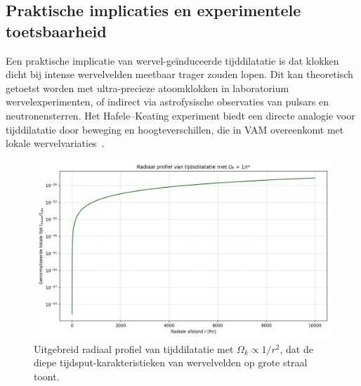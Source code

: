 \subsection{Praktische implicaties en experimentele toetsbaarheid}

Een praktische implicatie van wervel-geïnduceerde tijddilatatie is dat klokken dicht bij intense wervelvelden meetbaar trager zouden lopen. Dit kan theoretisch getoetst worden met ultra-precieze atoomklokken in laboratorium wervelexperimenten, of indirect via astrofysische observaties van pulsars en neutronensterren. Het Hafele–Keating experiment biedt een directe analogie voor tijddilatatie door beweging en hoogteverschillen, die in VAM overeenkomt met lokale wervelvariaties~\cite{hafele1972around}.

\begin{figure}[ht!]
    \centering
    \includegraphics[width=0.7\linewidth]{05-LogarithmicDecayLocalTime_nl}
    \caption{Uitgebreid radiaal profiel van tijddilatatie met $\Omega_k \propto 1/r^2$, dat de diepe tijdsput-karakteristieken van wervelvelden op grote straal toont.}
    \label{fig:NewGraph}
\end{figure}